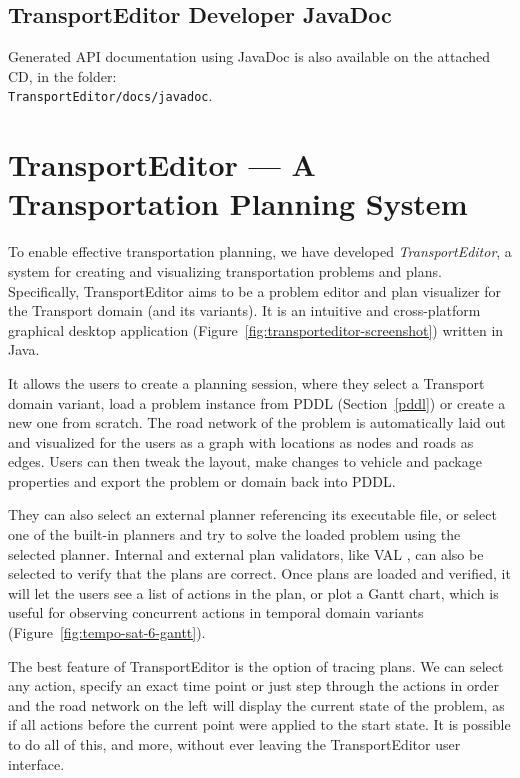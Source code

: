 \subsection*{TransportEditor Developer JavaDoc}\label{transporteditor-developer-javadoc}

Generated API documentation using JavaDoc is also available on the attached CD, in the folder:\\
\verb+TransportEditor/docs/javadoc+.

\newpage

\section*{TransportEditor --- A Transportation Planning System}

To enable effective transportation planning,
we have developed \textit{TransportEditor}, a system for creating and visualizing transportation problems and plans.
Specifically, TransportEditor aims to be a problem editor and plan visualizer for the Transport domain (and its variants). It is an intuitive and cross-platform graphical desktop application (Figure~\ref{fig:transporteditor-screenshot})
written in Java.

It allows the users to create a planning session, where they
select a Transport domain variant, load a problem instance from PDDL (Section~\ref{pddl}) or create a new one from scratch.
The road network of the problem is automatically laid out and visualized for the users as a graph with locations as nodes and roads as edges.
Users can then tweak the layout, make changes to vehicle and package properties
and export the problem or domain back into PDDL.

They can also select an external planner
referencing its executable file, or select one of the built-in planners and try to solve
the loaded problem using the selected planner. Internal and external plan validators, like VAL \citep{Howey2003}, can also be selected to verify that the plans are correct.
Once plans are loaded and verified, it will let the users see a list of actions
in the plan, or plot a Gantt chart, which is useful for observing concurrent actions in temporal domain variants (Figure~\ref{fig:tempo-sat-6-gantt}).

The best feature of TransportEditor is the option of tracing plans. We can select
any action, specify an exact time point or just step through the actions in order and
the road network on the left will display the current state of the problem, as if
all actions before the current point were applied to the start state.
It is possible to do all of this, and more, without ever leaving the TransportEditor user interface.

